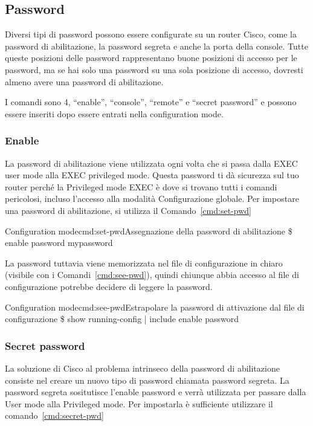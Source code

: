 \subsection{Password}
Diversi tipi di password possono essere configurate su un router Cisco, come la password di abilitazione, la password segreta e anche la porta della console. Tutte queste posizioni delle password rappresentano buone posizioni di accesso per le password, ma se hai solo una password su una sola posizione di accesso, dovresti almeno avere una password di abilitazione.

I comandi sono 4, “enable”, “console”, “remote” e “secret password” e possono essere inseriti dopo essere entrati nella configuration mode.

\subsubsection{Enable}
La password di abilitazione viene utilizzata ogni volta che si passa dalla EXEC user mode alla EXEC privileged mode. Questa password ti dà sicurezza sul tuo router perché la Privileged mode EXEC è dove si trovano tutti i comandi pericolosi, incluso l’accesso alla modalità Configurazione globale. Per impostare una password di abilitazione, si utilizza il Comando~\ref{cmd:set-pwd}

\begin{cmds}{Configuration mode}{cmd:set-pwd}{Assegnazione della password di abilitazione}
    \$ enable password \textcolor{Highlight1}{mypassword}
\end{cmds}

La password tuttavia viene memorizzata nel file di configurazione in chiaro (visibile con i Comandi~\ref{cmd:see-pwd}), quindi chiunque abbia accesso al file di configurazione potrebbe decidere di leggere la password.

\begin{cmds}{Configuration mode}{cmd:see-pwd}{Estrapolare la password di attivazione dal file di configurazione}
    \$ show running-config | include enable password
\end{cmds}

\subsubsection{Secret password}
La soluzione di Cisco al problema intrinseco della password di abilitazione consiste nel creare un nuovo tipo di password chiamata password segreta. La password segreta sositutisce l'enable password e verrà utilizzata per passare dalla User mode alla Privileged mode. Per impostarla è sufficiente utilizzare il comando~\ref{cmd:secret-pwd}

